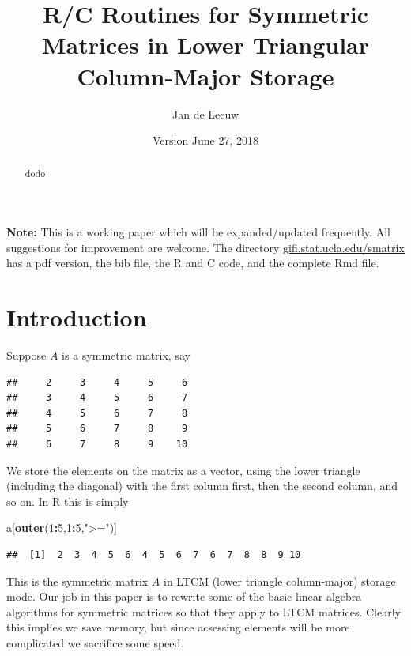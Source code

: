 \documentclass[12pt,]{article}
\title{R/C Routines for Symmetric Matrices in Lower Triangular Column-Major
Storage}
\author{Jan de Leeuw}
\date{Version June 27, 2018}
\newenvironment{Shaded}{\begin{snugshade}}{\end{snugshade}}
\newcommand{\DecValTok}[1]{\textcolor[rgb]{0.00,0.00,0.81}{#1}}
\newcommand{\KeywordTok}[1]{\textcolor[rgb]{0.13,0.29,0.53}{\textbf{#1}}}
\newcommand{\NormalTok}[1]{#1}
\newcommand{\OperatorTok}[1]{\textcolor[rgb]{0.81,0.36,0.00}{\textbf{#1}}}
\newcommand{\StringTok}[1]{\textcolor[rgb]{0.31,0.60,0.02}{#1}}
\begin{document}
\maketitle
\begin{abstract}
dodo
\end{abstract}

{
\setcounter{tocdepth}{2}
\tableofcontents
}
\textbf{Note:} This is a working paper which will be expanded/updated
frequently. All suggestions for improvement are welcome. The directory
\href{http://gifi.stat.ucla.edu/smatrix}{gifi.stat.ucla.edu/smatrix} has
a pdf version, the bib file, the R and C code, and the complete Rmd
file.

\hypertarget{introduction}{%
\section{Introduction}\label{introduction}}

Suppose \(A\) is a symmetric matrix, say

\begin{verbatim}
##     2     3     4     5     6 
##     3     4     5     6     7 
##     4     5     6     7     8 
##     5     6     7     8     9 
##     6     7     8     9    10
\end{verbatim}

We store the elements on the matrix as a vector, using the lower
triangle (including the diagonal) with the first column first, then the
second column, and so on. In R this is simply

\begin{Shaded}
\begin{Highlighting}[]
\NormalTok{a[}\KeywordTok{outer}\NormalTok{(}\DecValTok{1}\OperatorTok{:}\DecValTok{5}\NormalTok{,}\DecValTok{1}\OperatorTok{:}\DecValTok{5}\NormalTok{,}\StringTok{">="}\NormalTok{)]}
\end{Highlighting}
\end{Shaded}

\begin{verbatim}
##  [1]  2  3  4  5  6  4  5  6  7  6  7  8  8  9 10
\end{verbatim}

This is the symmetric matrix \(A\) in LTCM (lower triangle column-major)
storage mode. Our job in this paper is to rewrite some of the basic
linear algebra algorithms for symmetric matrices so that they apply to
LTCM matrices. Clearly this implies we save memory, but since acsessing
elements will be more complicated we sacrifice some speed.
\end{document}
